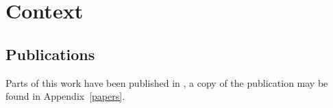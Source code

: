 \section*{Context}
\subsection*{Publications}
Parts of this work have been published in , a copy of the publication may be found in Appendix~\ref{papers}.
